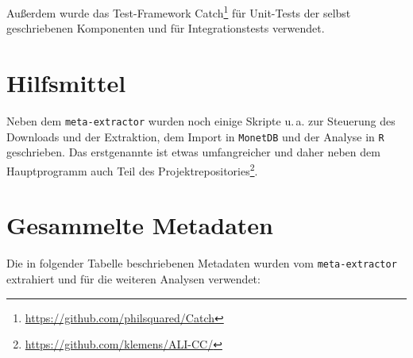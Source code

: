 \documentclass[a4paper,12pt,titlepage=false]{scrreprt}
\begin{document}
Außerdem wurde das Test-Framework
Catch\footnote{\url{https://github.com/philsquared/Catch}} für Unit-Tests der
selbst geschriebenen Komponenten und für Integrationstests verwendet.

\section{Hilfsmittel}

Neben dem \texttt{meta-extractor} wurden noch einige Skripte u.\,a. zur
Steuerung des Downloads und der Extraktion, dem Import in \texttt{MonetDB} und
der Analyse in \texttt{R} geschrieben. Das erstgenannte ist etwas umfangreicher
und daher neben dem Hauptprogramm auch Teil des
Projektrepositories\footnote{\url{https://github.com/klemens/ALI-CC/}}.

\section{Gesammelte Metadaten}
\label{csv-data}

Die in folgender Tabelle beschriebenen Metadaten wurden vom \texttt{meta-extractor}
extrahiert und für die weiteren Analysen verwendet:
\end{document}
